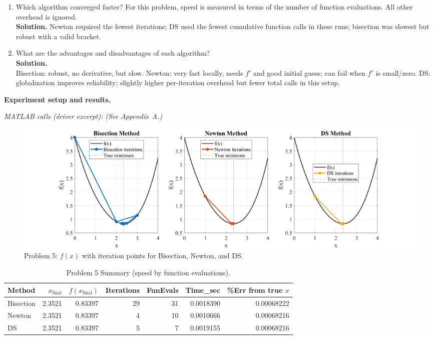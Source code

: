 \documentclass[11pt]{article}
\begin{document}
	\begin{enumerate}[label=5(\alph*)]
		
		\item Which algorithm converged faster? For this problem, speed is measured in terms of the number of function evaluations. All other overhead is ignored.\\
		\textbf{Solution.} Newton required the fewest iterations; DS used the fewest cumulative function calls in these runs; bisection was slowest but robust with a valid bracket.
		
		\item What are the advantages and disadvantages of each algorithm?\\
		\textbf{Solution.}\\
		Bisection: robust, no derivative, but slow. Newton: very fast locally, needs $f'$ and good initial guess; can fail when $f'$ is small/zero. DS: globalization improves reliability; slightly higher per-iteration overhead but fewer total calls in this setup.
		
	\end{enumerate}
	
	\noindent\textbf{Experiment setup and results.}
	
	\textit{MATLAB calls (driver excerpt):} \emph{(See Appendix~A.)}
	
	\begin{figure}[H]\centering
		\includegraphics[width=0.98\linewidth]{plots/5a_fx_vs_iters.png}
		\caption{Problem 5: \(f(x)\) with iteration points for Bisection, Newton, and DS.}
	\end{figure}
	
	\begin{table}[H]\centering
		\caption{Problem 5 Summary (speed by function evaluations).}
		\begin{tabular}{lrrrrrr}
			\toprule
			Method & $x_{\text{final}}$ & $f(x_{\text{final}})$ & Iterations & FunEvals & Time\_sec & \%Err from true $x$ \\
			\midrule
			Bisection & 2.3521 & 0.83397 & 29 & 31 & 0.0018390 & 0.00068222 \\
			Newton    & 2.3521 & 0.83397 &  4 & 10 & 0.0010666 & 0.00068216 \\
			DS        & 2.3521 & 0.83397 &  5 &  7 & 0.0019155 & 0.00068216 \\
			\bottomrule
		\end{tabular}
	\end{table}
	
\end{document}
